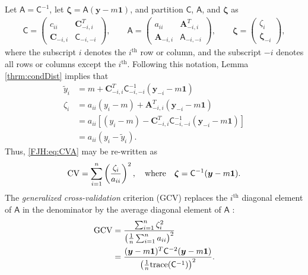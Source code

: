 \documentclass{iitthesis}          %
\newcommand{\bm}[1]{\boldsymbol{#1}}
\newcommand{\trace}[1]{\textup{trace}{#1}}
\newcommand{\vzeta}{{\bm{\zeta}}}
\newcommand{\vA}{\bm{A}}
\newcommand{\vC}{\bm{C}}
\newcommand{\vy}{\bm{y}}
\newcommand{\vone}{\bm{1}}
\newcommand{\mA}{\mathsf{A}}
\newcommand{\mC}{\mathsf{C}}
\begin{document}
Let $\mA = \mC^{-1}$, let $\vzeta = \mA (\vy - m \vone)$, and partition $\mC$, $\mA$, and $\vzeta$ as
\begin{gather*}
\mC = \begin{pmatrix} c_{ii}  & \vC_{-i,i}^T \\  \vC_{-i,i} & \mC_{-i,-i}\end{pmatrix}, \qquad
\mA = \begin{pmatrix} a_{ii}  & \vA_{-i,i}^T \\  \vA_{-i,i} & \mA_{-i,-i}\end{pmatrix}, \qquad \vzeta = \begin{pmatrix} \zeta_i   \\  \vzeta_{-i} \end{pmatrix},
\end{gather*}
where the subscript $i$ denotes the $i^{\text{th}}$ row or column, and the subscript $-i$ denotes all rows or columns except the $i^{\text{th}}$. Following this notation, Lemma \ref{thrm:condDist} implies that 
\begin{align*}
\widetilde{y}_i & = m + \vC^T_{-i,i} \mC_{-i,-i}^{-1} (\vy_{-i} -m \vone)  \\
\zeta_i  & = a_{ii}(y_i - m) + \vA_{-i,i}^T(\vy_{-i} - m \vone) \\
& = a_{ii}[(y_i - m) - \vC^T_{-i,i} \mC_{-i,-i}^{-1} (\vy_{-i} -m \vone)] \\
& = a_{ii}(y_i - \widetilde{y}_i).
\end{align*}
Thus, \eqref{FJH:eq:CVA} may be re-written as 
\begin{equation*} %
\textup{CV} = \sum_{i=1}^n \left(\frac{\zeta_i}{a_{ii}} \right)^2, \quad 
\text{where} \quad \vzeta = \mC^{-1}(\vy - m \vone).
\end{equation*}
The \emph{generalized cross-validation} criterion (GCV) replaces the $i^{\text{th}}$ diagonal element of $\mA$ in the denominator by the average diagonal element of $\mA$ \cite{CraWah79a,GolHeaWah79a,Wah90}:
\begin{align*} 
\textup{GCV} &
= \frac{\sum_{i=1}^n\zeta_i^2}{\left(\frac 1n \sum_{i=1}^n a_{ii} \right)^2} \\
& = \frac{(\vy - m\vone)^T \mC^{-2} (\vy - m \vone)}{\left(\frac 1n \trace(\mC^{-1}) \right)^2}.
\end{align*}
\end{document}
